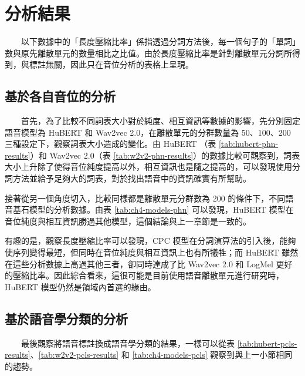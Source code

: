 


\section{分析結果} 

　　以下數據中的「長度壓縮比率」係指透過分詞方法後，每一個句子的「單詞」數與原先離散單元的數量相比之比值。由於長度壓縮比率是針對離散單元分詞所得到，與標註無關，因此只在音位分析的表格上呈現。

\subsection{基於各自音位的分析}

　　首先，為了比較不同詞表大小對於純度、相互資訊等數據的影響，先分別固定語音模型為 HuBERT 和 Wav2vec 2.0，在離散單元的分群數量為 50、100、200 三種設定下，觀察詞表大小造成的變化。由 HuBERT （表 \ref{tab:hubert-phn-results}）和 Wav2vec 2.0（表 \ref{tab:w2v2-phn-results}）的數據比較可觀察到，詞表大小上升除了使得音位純度提高以外，相互資訊也是隨之提高的，可以發現使用分詞方法並給予足夠大的詞表，對於找出語音中的資訊確實有所幫助。

        接著從另一個角度切入，比較同樣都是離散單元分群數為 200 的條件下，不同語音基石模型的分析數據。由表 \ref{tab:ch4-models-phn} 可以發現，HuBERT 模型在音位純度與相互資訊勝過其他模型，這個結論與上一章節是一致的。

        有趣的是，觀察長度壓縮比率可以發現，CPC 模型在分詞演算法的引入後，能夠使序列變得最短，但同時在音位純度與相互資訊上也有所犧牲；而 HuBERT 雖然在這些分析數據上高過其他三者，卻同時達成了比 Wav2vec 2.0 和 LogMel 更好的壓縮比率。因此綜合看來，這很可能是目前使用語音離散單元進行研究時，HuBERT 模型仍然是領域內首選的緣由。

                

\subsection{基於語音學分類的分析}

　　最後觀察將語音標註換成語音學分類的結果，一樣可以從表 \ref{tab:hubert-pcls-results}、\ref{tab:w2v2-pcls-results} 和 \ref{tab:ch4-models-pcls} 觀察到與上一小節相同的趨勢。

                


